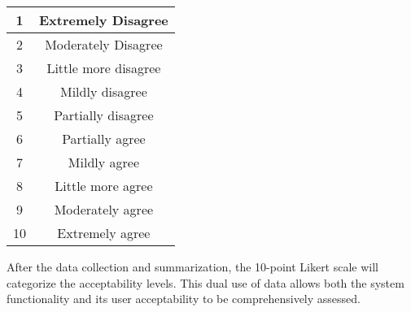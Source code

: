 \begin{table}[h]
	\centering
	\begin{tabular}{|c|c|}
		\hline
		1  & Extremely Disagree   \\ \hline
		2  & Moderately Disagree  \\ \hline
		3  & Little more disagree \\ \hline
		4  & Mildly disagree      \\ \hline
		5  & Partially disagree   \\ \hline
		6  & Partially agree      \\ \hline
		7  & Mildly agree         \\ \hline
		8  & Little more agree    \\ \hline
		9  & Moderately agree     \\ \hline
		10 & Extremely agree      \\ \hline
	\end{tabular}
\end{table}

After the data collection and summarization, the 10-point Likert scale will categorize the acceptability levels. This dual use of data allows both the system functionality and its user acceptability to be comprehensively assessed. 
